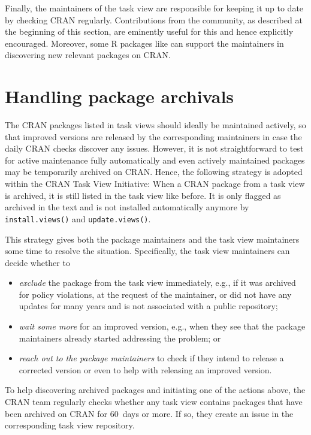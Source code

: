 Finally, the maintainers of the task view are responsible for keeping it up to date
by checking CRAN regularly. Contributions from the community, as described at the
beginning of this section, are eminently useful for this and hence explicitly
encouraged. Moreover, some R packages like  \citep{ctvsuggest} can support
the maintainers in discovering new relevant packages on CRAN.

\section{Handling package archivals}\label{handling-package-archivals}

The CRAN packages listed in task views should ideally be maintained actively,
so that improved versions are released by the corresponding maintainers in case
the daily CRAN checks discover any issues.
However, it is not straightforward to test for active maintenance fully automatically
and even actively maintained packages may be temporarily archived on
CRAN. Hence, the following strategy is adopted within the CRAN Task View
Initiative: When a CRAN package from a task view is archived, it is still listed in the
task view like before. It is only flagged as archived in the text and is not
installed automatically anymore by \texttt{install.views()} and \texttt{update.views()}.

This strategy gives both the package maintainers and the task view maintainers
some time to resolve the situation. Specifically, the task view maintainers can
decide whether to

\begin{itemize}
\tightlist
\item
  \emph{exclude} the package from the task view immediately, e.g., if it was
  archived for policy violations, at the request of the maintainer, or did not
  have any updates for many years and is not associated with a public repository;
\item
  \emph{wait some more} for an improved version, e.g., when they see that the
  package maintainers already started addressing the problem; or
\item
  \emph{reach out to the package maintainers} to check if they intend to release a
  corrected version or even to help with releasing an improved
  version.
\end{itemize}

To help discovering archived packages and initiating one of the actions above,
the CRAN team regularly checks whether any task view contains packages that have
been archived on CRAN for 60~days or more. If so, they create an issue in the
corresponding task view repository.

